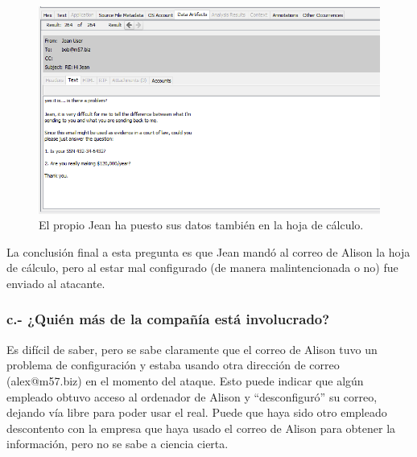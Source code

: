 \documentclass{article}
\begin{document}
\begin{figure}[H]
    \centering
    \includegraphics[width=\textwidth]{imagenes/Windows/Captura de pantalla (16).png}
    \caption{El propio Jean ha puesto sus datos también en la hoja de cálculo.}
\end{figure}

La conclusión final a esta pregunta es que Jean mandó al correo de Alison la hoja de cálculo, pero al estar mal configurado (de manera malintencionada o no) fue enviado al atacante.

{}
\subsubsection*{c.- ¿Quién más de la compañía está involucrado?}

Es difícil de saber, pero se sabe claramente que el correo de Alison tuvo un problema de configuración y estaba usando otra dirección de correo (alex@m57.biz) en el momento del ataque. Esto puede indicar que algún empleado obtuvo acceso al ordenador de Alison y ``desconfiguró'' su correo, dejando vía libre para poder usar el real. Puede que haya sido otro empleado descontento con la empresa que haya usado el correo de Alison para obtener la información, pero no se sabe a ciencia cierta.
\end{document}
